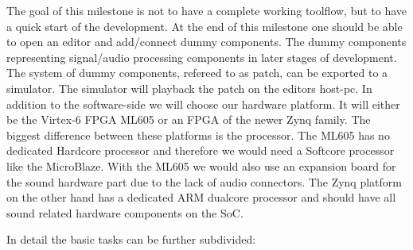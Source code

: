 The goal of this milestone is not to have a complete working toolflow, but to have a quick start of the development. At the end of this milestone one should be able to open an editor and add/connect dummy components. The dummy components representing signal/audio processing components in later stages of development. The system of dummy components, refereed to as patch, can be exported to a simulator. The simulator will playback the patch on the editors host-pc.
In addition to the software-side we will choose our hardware platform. It will either be the Virtex-6 \ac{FPGA} ML605 or an \ac{FPGA} of the newer Zynq family. The biggest difference between these platforms is the processor. The ML605 has no dedicated Hardcore processor and therefore we would need a Softcore processor like the MicroBlaze. With the ML605 we would also use an expansion board for the sound hardware part due to the lack of audio connectors. The Zynq platform on the other hand has a dedicated ARM dualcore processor and should have all sound related hardware components on the \ac{SoC}.

In detail the basic tasks can be further subdivided:

